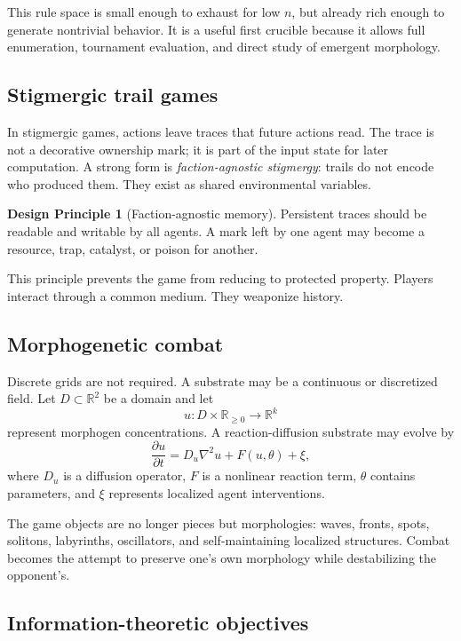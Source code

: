 \documentclass[11pt,a4paper]{article}
\theoremstyle{plain}
\theoremstyle{definition}
\newtheorem{principle}[theorem]{Design Principle}
\newcommand{\R}{\mathbb{R}}
\begin{document}
This rule space is small enough to exhaust for low $n$, but already rich enough to generate nontrivial behavior. It is a useful first crucible because it allows full enumeration, tournament evaluation, and direct study of emergent morphology.

\subsection{Stigmergic trail games}\label{subsec:stigmergy}

In stigmergic games, actions leave traces that future actions read. The trace is not a decorative ownership mark; it is part of the input state for later computation. A strong form is \emph{faction-agnostic stigmergy}: trails do not encode who produced them. They exist as shared environmental variables.

\begin{principle}[Faction-agnostic memory]\label{prin:faction-agnostic}
Persistent traces should be readable and writable by all agents. A mark left by one agent may become a resource, trap, catalyst, or poison for another.
\end{principle}

This principle prevents the game from reducing to protected property. Players interact through a common medium. They weaponize history.

\subsection{Morphogenetic combat}\label{subsec:morphogenesis}

Discrete grids are not required. A substrate may be a continuous or discretized field. Let $D\subset\R^2$ be a domain and let
\[
  u:D\times\R_{\geq 0}\to \R^k
\]
represent morphogen concentrations. A reaction-diffusion substrate may evolve by
\[
  \frac{\partial u}{\partial t}=D_u\nabla^2u+F(u,\theta)+\xi,
\]
where $D_u$ is a diffusion operator, $F$ is a nonlinear reaction term, $\theta$ contains parameters, and $\xi$ represents localized agent interventions.

The game objects are no longer pieces but morphologies: waves, fronts, spots, solitons, labyrinths, oscillators, and self-maintaining localized structures. Combat becomes the attempt to preserve one's own morphology while destabilizing the opponent's.

\subsection{Information-theoretic objectives}\label{subsec:information}
\end{document}
